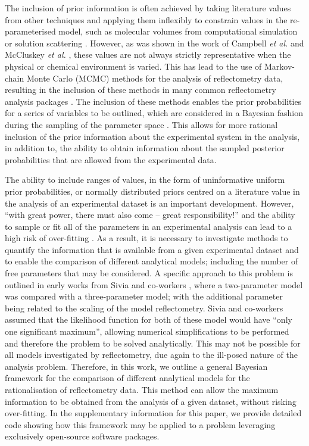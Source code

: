 \documentclass[%
 reprint,
 superscriptaddress,
 amsmath,amssymb,
 aps,
]{revtex4-1}
\begin{document}
The inclusion of prior information is often achieved by taking literature values from other techniques and applying them inflexibly to constrain values in the re-parameterised model, such as molecular volumes from computational simulation or solution scattering \cite{sun_order_1994,armen_phospholipid_1998}. 
However, as was shown in the work of Campbell \emph{et al.} \cite{campbell_structure_2018} and McCluskey \emph{et al.} \cite{mccluskey_bayesian_2019}, these values are not always strictly representative when the physical or chemical environment is varied.
This has lead to the use of Markov-chain Monte Carlo (MCMC) methods for the analysis of reflectometry data, resulting in the inclusion of these methods in many common reflectometry analysis packages \cite{hughes_rascal_2017,kienzle_ncnr_2017,nelson_refnx_2019}.
The inclusion of these methods enables the prior probabilities for a series of variables to be outlined, which are considered in a Bayesian fashion during the sampling of the parameter space \cite{bayes_essay_1763,mccluskey_bayesian_2019}. 
This allows for more rational inclusion of the prior information about the experimental system in the analysis, in addition to, the ability to obtain information about the sampled posterior probabilities that are allowed from the experimental data. 

The ability to include ranges of values, in the form of uninformative uniform prior probabilities, or normally distributed priors centred on a literature value in the analysis of an experimental dataset is an important development. 
However, ``with great power, there must also come -- great responsibility!'' \cite{lee_introducting_1962} and the ability to sample or fit all of the parameters in an experimental analysis can lead to a high risk of over-fitting \cite{mayer_drawing_2010}. 
As a result, it is necessary to investigate methods to quantify the information that is available from a given experimental dataset and to enable the comparison of different analytical models; including the number of free parameters that may be considered. 
A specific approach to this problem is outlined in early works from Sivia and co-workers \cite{sivia_analysis_1991,geoghegan_experimental_1996,sivia_bayesian_1998}, where a two-parameter model was compared with a three-parameter model; with the additional parameter being related to the scaling of the model reflectometry. 
Sivia and co-workers assumed that the likelihood function for both of these model would have ``only one significant maximum'', allowing numerical simplifications to be performed and therefore the problem to be solved analytically. 
This may not be possible for all models investigated by reflectometry, due again to the ill-posed nature of the analysis problem. 
Therefore, in this work, we outline a general Bayesian framework for the comparison of different analytical models for the rationalisation of reflectometry data. 
This method can allow the maximum information to be obtained from the analysis of a given dataset, without risking over-fitting.
In the supplementary information for this paper, we provide detailed code showing how this framework may be applied to a problem leveraging exclusively open-source software packages. 
\end{document}
